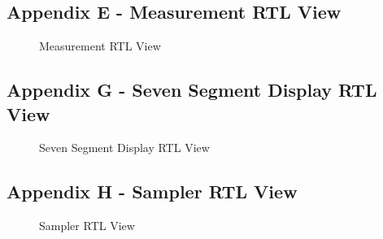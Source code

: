 \documentclass[a4paper,12pt]{article}
\begin{document}
\subsection{Appendix E - Measurement RTL View}
\begin{figure}[H]
	\centering
	\caption{Measurement RTL View}
\end{figure}
\newpage
\subsection{Appendix G - Seven Segment Display RTL View}
\begin{figure}[H]
	\centering
	\caption{Seven Segment Display RTL View}
\end{figure}
\newpage
\subsection{Appendix H - Sampler RTL View}
\begin{figure}[H]
	\centering
	\caption{Sampler RTL View}
\end{figure}
\newpage
{}
\begin{flushleft}

\end{flushleft}
\end{document}
